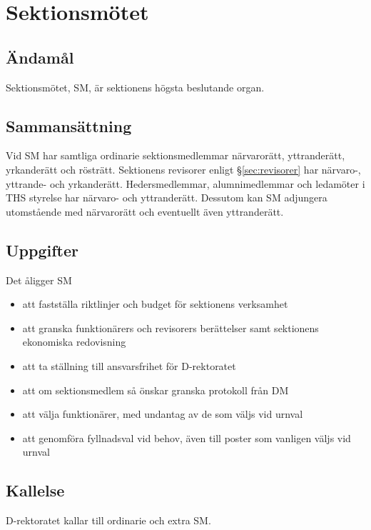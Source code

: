 \documentclass{dgovdoc}
\begin{document}
\section{Sektionsmötet}

\subsection{Ändamål}

Sektionsmötet, SM, är sektionens högsta beslutande organ.

\subsection{Sammansättning}

Vid SM har samtliga ordinarie sektionsmedlemmar närvarorätt, yttranderätt,
yrkanderätt och rösträtt. Sektionens revisorer enligt \S\ref{sec:revisorer} har
närvaro-, yttrande- och yrkanderätt. Hedersmedlemmar, alumnimedlemmar och
ledamöter i THS styrelse har närvaro- och yttranderätt. Dessutom kan SM
adjungera utomstående med närvarorätt och eventuellt även yttranderätt.

\subsection{Uppgifter}

Det åligger SM

\begin{itemize}
  \item att fastställa riktlinjer och budget för sektionens verksamhet
  \item att granska funktionärers och revisorers berättelser samt sektionens
    ekonomiska redovisning
  \item att ta ställning till ansvarsfrihet för D-rektoratet
  \item att om sektionsmedlem så önskar granska protokoll från DM
  \item att välja funktionärer, med undantag av de som väljs vid urnval
  \item att genomföra fyllnadsval vid behov, även till poster som vanligen
    väljs vid urnval
\end{itemize}

\subsection{Kallelse}
\label{sec:kallelse}

D-rektoratet kallar till ordinarie och extra SM.
\end{document}
